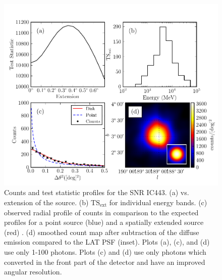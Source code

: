 \documentclass[12pt,preprint]{aastex}
\newcommand{\gev}{\text{GeV}\xspace}
\newcommand{\tsext}{{\ensuremath{\text{TS}_{\text{ext}}}}\xspace}
\newcommand{\ts}{\text{TS}\xspace}
\begin{document}



\clearpage
\begin{figure}
  \begin{center}
    \includegraphics{ic443_plots/four_plots_ic443.pdf}
    \caption{
    Counts and test statistic profiles for the SNR IC443. (a) \ts
    vs. extension of the source. (b) \tsext for individual energy bands. (c)
    observed radial profile of counts in comparison to the expected profiles
    for a point source (blue) and a spatially extended source (red) . (d)
    smoothed count map after subtraction of the diffuse emission compared
    to the LAT PSF (inset).  Plots (a), (c), and (d) use only 1-100 \gev photons. 
    Plots (c) and (d)
    use only photons which converted in the front
    part of the detector and have an improved angular resolution.
    }
    \label{four_plots_ic443}
  \end{center}
\end{figure}
\end{document}
